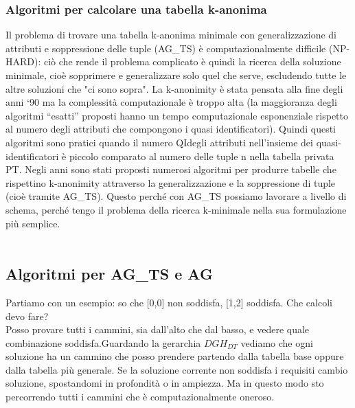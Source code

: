 \subsubsection{Algoritmi per calcolare una tabella k-anonima}
Il problema di trovare una tabella k-anonima minimale con generalizzazione di attributi e soppressione delle tuple (AG\_TS) è computazionalmente difficile (NP-HARD): ciò che rende il problema complicato è quindi la ricerca della soluzione minimale, cioè sopprimere e generalizzare solo quel che serve, escludendo tutte le altre soluzioni che "ci sono sopra".
La k-anonimity è stata pensata alla fine degli anni ‘90 ma la complessità computazionale è troppo alta (la maggioranza degli algoritmi “esatti” proposti hanno un tempo computazionale esponenziale rispetto al numero degli attributi che compongono i quasi identificatori). Quindi questi algoritmi sono pratici quando il numero QIdegli attributi nell’insieme dei quasi-identificatori è piccolo comparato al numero delle tuple n nella tabella privata PT.
Negli anni sono stati proposti numerosi algoritmi per produrre tabelle che rispettino k-anonimity attraverso la generalizzazione e la soppressione di tuple (cioè tramite AG\_TS). Questo perché con AG\_TS possiamo lavorare a livello di schema, perché tengo il problema della ricerca k-minimale nella sua formulazione più semplice.\\\\

\subsection{Algoritmi per AG\_TS e AG}
Partiamo con un esempio: so che [0,0] non soddisfa, [1,2] soddisfa. Che calcoli devo fare?\\ Posso provare tutti i cammini, sia dall’alto che dal basso, e vedere quale combinazione soddisfa.Guardando la gerarchia \(DGH_{DT}\) vediamo che ogni soluzione ha un cammino che posso prendere partendo dalla tabella base oppure dalla tabella più generale. Se la soluzione corrente non soddisfa i requisiti cambio soluzione, spostandomi in profondità o in ampiezza. Ma in questo modo sto percorrendo tutti i cammini che è computazionalmente oneroso. \\\\


